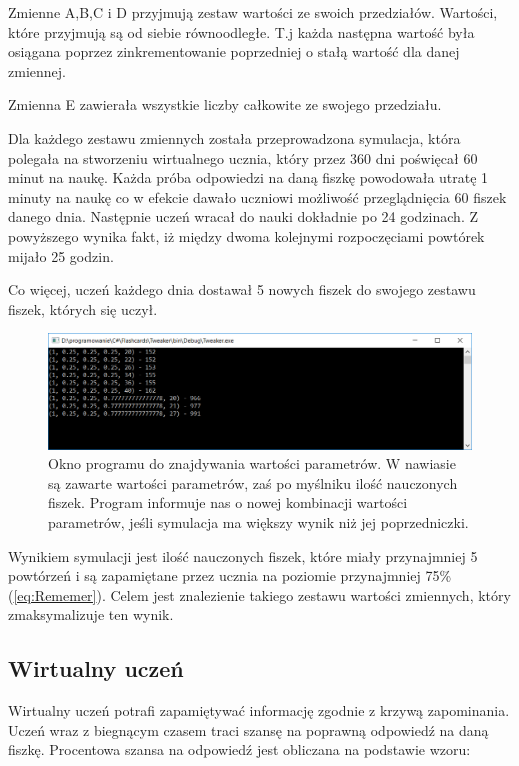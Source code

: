 Zmienne A,B,C i D przyjmują zestaw wartości ze swoich przedziałów. Wartości, które przyjmują są od siebie równoodległe. T.j każda następna wartość była osiągana poprzez zinkrementowanie poprzedniej o stałą wartość dla danej zmiennej.

Zmienna E zawierała wszystkie liczby całkowite ze swojego przedziału.
\vspace{5mm}


Dla każdego zestawu zmiennych została przeprowadzona symulacja, która polegała na stworzeniu wirtualnego ucznia, który przez 360 dni poświęcał 60 minut na naukę. Każda próba odpowiedzi na daną fiszkę powodowała utratę 1 minuty na naukę co w efekcie dawało uczniowi możliwość przeglądnięcia 60 fiszek danego dnia. Następnie uczeń wracał do nauki dokładnie po 24 godzinach. Z powyższego wynika fakt, iż między dwoma kolejnymi rozpoczęciami powtórek mijało 25 godzin.

Co więcej, uczeń każdego dnia dostawał 5 nowych fiszek do swojego zestawu fiszek, których się uczył.

\begin{figure}[h]
	\centering
	\includegraphics[width=\textwidth]{images/tweaker.png}
	 \caption{Okno programu do znajdywania wartości parametrów. W nawiasie są zawarte wartości parametrów, zaś po myślniku ilość nauczonych fiszek. Program informuje nas o nowej kombinacji wartości parametrów, jeśli symulacja ma większy wynik niż jej poprzedniczki.}
\end{figure}

Wynikiem symulacji jest ilość nauczonych fiszek, które miały przynajmniej 5 powtórzeń i są zapamiętane przez ucznia na poziomie przynajmniej 75\% (\ref{eq:Rememer}). Celem jest znalezienie takiego zestawu wartości zmiennych, który zmaksymalizuje ten wynik.

\subsection{Wirtualny uczeń}

Wirtualny uczeń potrafi zapamiętywać informację zgodnie z krzywą zapominania. Uczeń wraz z biegnącym czasem traci szansę na poprawną odpowiedź na daną fiszkę. Procentowa szansa na odpowiedź jest obliczana na podstawie wzoru:


